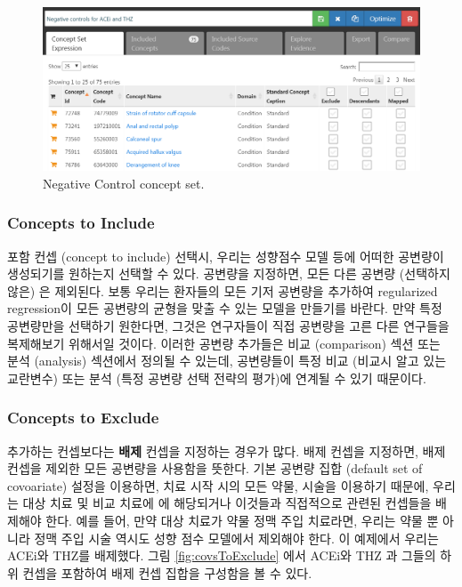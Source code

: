 \documentclass[11pt]{book}
\theoremstyle{definition}
\theoremstyle{definition}
\theoremstyle{definition}
\theoremstyle{remark}
\begin{document}
\begin{figure}

{\centering \includegraphics[width=1\linewidth]{images/PopulationLevelEstimation/ncConceptSet} 

}

\caption{Negative Control concept set.}\label{fig:ncConceptSet}
\end{figure}

\subsubsection*{Concepts to Include}\label{concepts-to-include}

포함 컨셉 (concept to include) 선택시, 우리는 성향점수 모델 등에 어떠한
공변량이 생성되기를 원하는지 선택할 수 있다. 공변량을 지정하면, 모든
다른 공변량 (선택하지 않은) 은 제외된다. 보통 우리는 환자들의 모든 기저
공변량을 추가하여 regularized regression이 모든 공변량의 균형을 맞출 수
있는 모델을 만들기를 바란다. 만약 특정 공변량만을 선택하기 원한다면,
그것은 연구자들이 직접 공변량을 고른 다른 연구들을 복제해보기 위해서일
것이다. 이러한 공변량 추가들은 비교 (comparison) 섹션 또는 분석
(analysis) 섹션에서 정의될 수 있는데, 공변량들이 특정 비교 (비교시 알고
있는 교란변수) 또는 분석 (특정 공변량 선택 전략의 평가)에 연계될 수 있기
때문이다.

\subsubsection*{Concepts to Exclude}\label{concepts-to-exclude}

추가하는 컨셉보다는 \textbf{배제} 컨셉을 지정하는 경우가 많다. 배제
컨셉을 지정하면, 배제 컨셉을 제외한 모든 공변량을 사용함을 뜻한다. 기본
공변량 집합 (default set of covoariate) 설정을 이용하면, 치료 시작 시의
모든 약물, 시술을 이용하기 때문에, 우리는 대상 치료 및 비교 치료에 에
해당되거나 이것들과 직접적으로 관련된 컨셉들을 배제해야 한다. 예를 들어,
만약 대상 치료가 약물 정맥 주입 치료라면, 우리는 약물 뿐 아니라 정맥
주입 시술 역시도 성향 점수 모델에서 제외해야 한다. 이 예제에서 우리는
ACEi와 THZ를 배제했다. 그림 \ref{fig:covsToExclude} 에서 ACEi와 THZ 과
그들의 하위 컨셉을 포함하여 배제 컨셉 집합을 구성함을 볼 수 있다.
\end{document}
